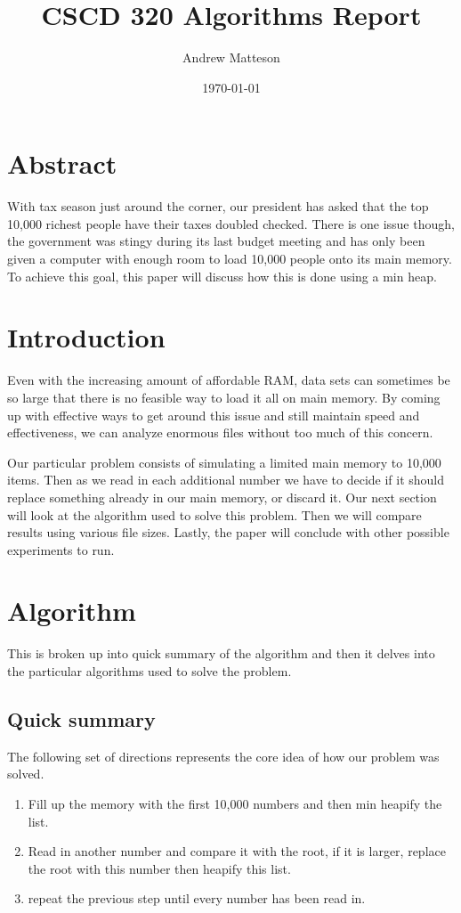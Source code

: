 \documentclass[12pt,letterpaper]{article}
\author{Andrew Matteson}
\title{CSCD 320 Algorithms Report}
\date{\today}
\begin{document}
\maketitle

\section{Abstract}


With tax season just around the corner, our president has asked that the top 10,000 richest people have their taxes doubled checked. There is one issue though, the government was stingy during its last budget meeting and has only been given a computer with enough room to load 10,000 people onto its main memory. To achieve this goal,  this paper will discuss how this is done using a min heap.

\section{Introduction}

Even with the increasing amount of affordable RAM, data sets can sometimes be so large that there is no feasible way to load it all on main memory. By coming up with effective ways to get around this issue and still maintain speed and effectiveness, we can analyze enormous files without too much of this concern.

Our particular problem consists of simulating a limited main memory to 10,000 items. Then as we read in each additional number we have to decide if it should replace something already in our main memory, or discard it.  Our next section will look at the algorithm used to solve this problem. Then we will compare results using various file sizes. Lastly, the paper will conclude with other possible experiments to run.


\section{Algorithm}
This is broken up into quick summary of the algorithm and then it delves into the particular algorithms used to solve the problem.

\subsection{Quick summary}
The following set of directions represents the core idea of how our problem was solved.
\begin{enumerate}
\item Fill up the memory with the first 10,000 numbers and then min heapify the list.
\item Read in another number and compare it with the root, if it is larger, replace the root with this number then heapify this list.
\item repeat the previous step until every number has been read in.
\end{enumerate}
\end{document}
